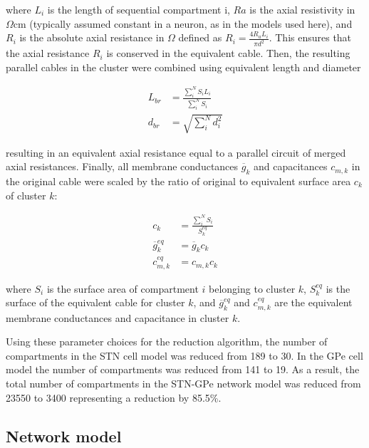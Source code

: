 where $L_i$ is the length of sequential compartment i, $Ra$ is the axial
resistivity in $\Omega$cm (typically assumed constant in a neuron, as in the
models used here), and $R_i$ is the absolute axial resistance in $\Omega$
defined as $R_i = \frac{4 R_a L_i}{\pi d^2}$. This
ensures that the axial resistance $R_i$ is conserved in the equivalent cable.
Then, the resulting parallel cables in the cluster were combined using equivalent length and diameter

\begin{align}
    L_{br} &= \frac{ \sum_i^N S_i L_i }{ \sum_i^N S_i } \\
    d_{br} &= \sqrt{ \sum_i^N d_i^2 }
\end{align}

resulting in an equivalent axial resistance equal to a parallel circuit of merged
axial resistances.
Finally, all membrane conductances $\overline{g}_k$ and capacitances $c_{m,k}$
in the original cable were scaled by the ratio of original to equivalent
surface area $c_k$ of cluster $k$:

\begin{align}
    c_k                     &= \frac{\sum_i^N S_i}{S^{eq}_k} \\
    \overline{g}^{eq}_k     &= \overline{g}_k c_k \\
    c_{m,k}^{eq}                &= c_{m,k} c_k
\end{align}

where $S_i$ is the surface area of compartment $i$ belonging to cluster $k$, $S^{eq}_k$ is
the surface of the equivalent cable for cluster $k$, and $ \overline{g}^{eq}_k $
and $c^{eq}_{m,k}$ are the equivalent membrane conductances and capacitance in cluster $k$.

Using these parameter choices for the reduction algorithm, the number of compartments
in the STN cell model was reduced from 189 to 30. In the GPe cell model the number of
compartments was reduced from 141 to 19. As a result, the total number of compartments
in the STN-GPe network model was reduced from 23550 to 3400 representing a reduction
by 85.5\%.

\subsection{Network model}

